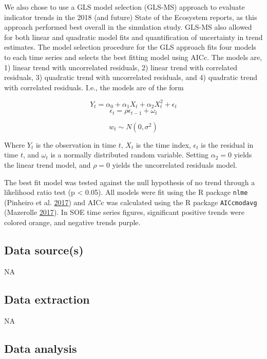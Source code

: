 \documentclass[
]{book}
\begin{document}
We also chose to use a GLS model selection (GLS-MS) approach to evaluate indicator trends in the 2018 (and future) State of the Ecosystem reports, as this approach performed best overall in the simulation study. GLS-MS also allowed for both linear and quadratic model fits and quantification of uncertainty in trend estimates. The model selection procedure for the GLS approach fits four models to each time series and selects the best fitting model using AICc. The models are, 1) linear trend with uncorrelated residuals, 2) linear trend with correlated residuals, 3) quadratic trend with uncorrelated residuals, and 4) quadratic trend with correlated residuals. I.e., the models are of the form

\[ Y_t = \alpha_0 + \alpha_1X_t + \alpha_2X_t^2 + \epsilon_t\]
\[\epsilon_t = \rho\epsilon_{t-1} + \omega_t\]

\[w_t \sim N(0, \sigma^2)\]

Where \(Y_t\) is the observation in time \(t\), \(X_t\) is the time index, \(\epsilon_t\) is the residual in time \(t\), and \(\omega_t\) is a normally distributed random variable. Setting \(\alpha_2 = 0\) yields the linear trend model, and \(\rho = 0\) yields the uncorrelated residuals model.

The best fit model was tested against the null hypothesis of no trend through a likelihood ratio test (p \textless{} 0.05). All models were fit using the R package \texttt{nlme} (Pinheiro et al. \protect\hyperlink{ref-Pinheiro2017}{2017}) and AICc was calculated using the R package \texttt{AICcmodavg} (Mazerolle \protect\hyperlink{ref-Mazerolle2017a}{2017}). In SOE time series figures, significant positive trends were colored orange, and negative trends purple.

\hypertarget{data-sources-42}{%
\subsection{Data source(s)}\label{data-sources-42}}

NA

\hypertarget{data-extraction-33}{%
\subsection{Data extraction}\label{data-extraction-33}}

NA

\hypertarget{data-analysis-40}{%
\subsection{Data analysis}\label{data-analysis-40}}
\end{document}
